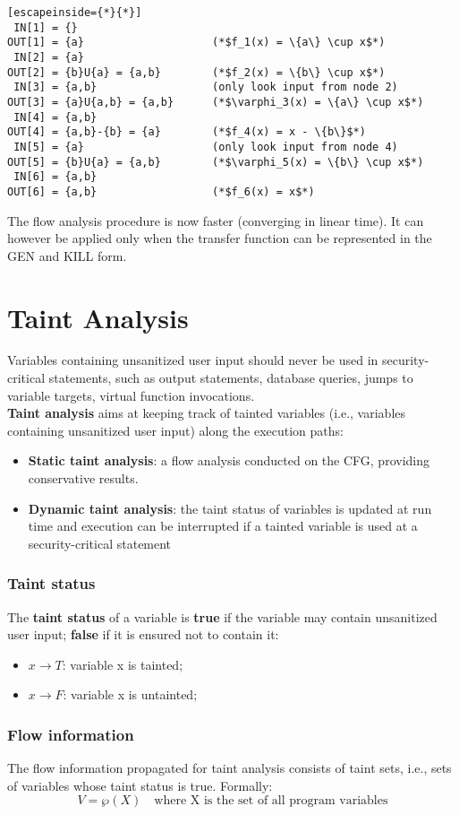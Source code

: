 \documentclass[a4paper, 10pt, titlepage]{article}
\begin{document}
\begin{lstlisting}[escapeinside={*}{*}]
 IN[1] = {}
OUT[1] = {a}					(*$f_1(x) = \{a\} \cup x$*)
 IN[2] = {a}
OUT[2] = {b}U{a} = {a,b}		(*$f_2(x) = \{b\} \cup x$*)
 IN[3] = {a,b}					(only look input from node 2)
OUT[3] = {a}U{a,b} = {a,b}		(*$\varphi_3(x) = \{a\} \cup x$*)
 IN[4] = {a,b}
OUT[4] = {a,b}-{b} = {a}		(*$f_4(x) = x - \{b\}$*)
 IN[5] = {a}					(only look input from node 4)
OUT[5] = {b}U{a} = {a,b}		(*$\varphi_5(x) = \{b\} \cup x$*)
 IN[6] = {a,b}
OUT[6] = {a,b}					(*$f_6(x) = x$*)
\end{lstlisting}
The flow analysis procedure is now faster (converging in linear time). It can however be applied only when the transfer function can be represented in the GEN and KILL form.

\newpage
\section{Taint Analysis}%
Variables containing unsanitized user input should never be used in security-critical statements, such as output statements, database queries, jumps to variable targets, virtual function invocations. \medskip \\
\textbf{Taint analysis} aims at keeping track of tainted variables (i.e., variables containing unsanitized user input) along the execution paths: 
\begin{itemize}
\item \textbf{Static taint analysis}: a flow analysis conducted on the CFG, providing conservative results.
\item \textbf{Dynamic taint analysis}: the taint status of variables is updated at run time and execution can be interrupted if a tainted variable is used at a security-critical statement
\end{itemize}  
\subsubsection*{Taint status}
The \textbf{taint status} of a variable is \textbf{true} if the variable may contain unsanitized user input; \textbf{false} if it is ensured not to contain it:
\begin{itemize}
\item $x \rightarrow T$: variable x is tainted;
\item $x \rightarrow F$: variable x is untainted;
\end{itemize}

\subsubsection*{Flow information}
The flow information propagated for taint analysis consists of taint sets, i.e., sets of variables whose taint status is true. Formally: 
\begin{equation*}
V = \wp(X) \quad \text{where X is the set of all program variables}
\end{equation*}
\end{document}

